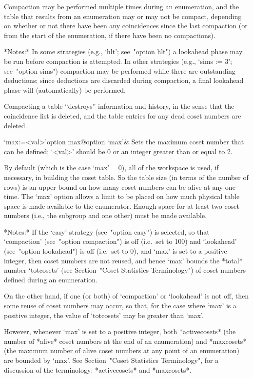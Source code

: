 Compaction may be performed  multiple times during an enumeration, and
the table that results from an  enumeration may or may not be compact,
depending on whether or not there have been any coincidences since the
last compaction (or  from the start of the  enumeration, if there have
been no compactions).

*Notes:*
In some strategies (e.g., `hlt'; see~"option hlt") a  lookahead  phase
may be run before compaction is attempted. In other strategies  (e.g.,
`sims := 3'; see~"option sims")  compaction  may  be  performed  while
there are  outstanding  deductions;  since  deductions  are  discarded
during compaction, a final lookahead  phase  will  (automatically)  be
performed.

Compacting a table ``destroys'' information and history, in the  sense
that the coincidence list is deleted, and the table  entries  for  any
dead coset numbers are deleted.

\>`max:=<val>'{option max}@{option `max'}&
Sets the maximum coset number that can be defined;
`<val>' should be $0$ or an integer greater than or equal to 2.

By default (which is the case `max'${}=0$), all of  the  workspace  is
used, if necessary, in building the coset table. So the table size (in
terms of the number of rows) is an  upper  bound  on  how  many  coset
numbers can be alive at any one time. The `max' option allows a  limit
to be placed on how much physical table space is made available to the
enumerator. Enough space for at least two  coset  numbers  (i.e.,  the
subgroup and one other) must be made available.

*Notes:*
If the `easy'  strategy  (see~"option  easy")  is  selected,  so  that
`compaction' (see~"option compaction") is off (i.e.~set  to  100)  and
`lookahead' (see~"option lookahead") is off (i.e.~set to 0), and `max'
is set to a positive integer, then coset numbers are not  reused,  and
hence `max' bounds the *total* number `totcosets' (see  Section~"Coset
Statistics  Terminology")  of  coset   numbers   defined   during   an
enumeration.

On the other hand, if one (or both) of `compaction' or `lookahead'  is
not off, then some reuse of coset numbers may occur, so that, for  the
case where `max' is a positive integer, the value of  `totcosets'  may
be greater than `max'.

However,  whenever  `max'  is  set  to  a   positive   integer,   both
*activecosets* (the number of *alive* coset numbers at the end  of  an
enumeration) and  *maxcosets*  (the  maximum  number  of  alive  coset
numbers at any point of an enumeration)  are  bounded  by  `max'.  See
Section~"Coset  Statistics  Terminology",  for  a  discussion  of  the
terminology: *activecosets* and *maxcosets*.

